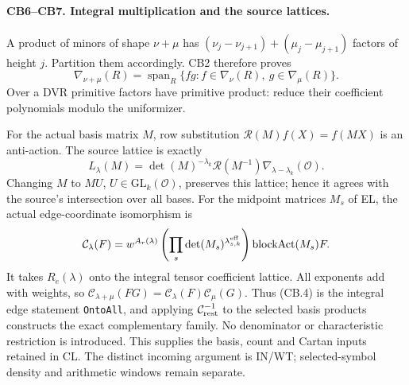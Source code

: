 \paragraph{CB6--CB7. Integral multiplication and the source lattices.}
A product of minors of shape $\nu+\mu$ has
$(\nu_j-\nu_{j+1})+(\mu_j-\mu_{j+1})$ factors of height $j$.
Partition them accordingly. CB2 therefore proves
\[
 \nabla_{\nu+\mu}(R)=\operatorname{span}_R
 \{fg:f\in\nabla_\nu(R),\ g\in\nabla_\mu(R)\}. \tag{CB.4}
\]
Over a DVR primitive factors have primitive product: reduce their coefficient polynomials modulo the uniformizer.

For the actual basis matrix $M$, row substitution $\mathcal R(M)f(X)=f(MX)$ is an anti-action. The source lattice is exactly
\[
 L_\lambda(M)=\det(M)^{-\lambda_k}\mathcal R(M^{-1})\nabla_{\lambda-\lambda_k}(\mathcal O).
\]
Changing $M$ to $MU$, $U\in\mathrm{GL}_k(\mathcal O)$, preserves this lattice; hence it agrees with the source's intersection over all bases.
For the midpoint matrices $M_s$ of EL, the actual edge-coordinate isomorphism is
\[
 \mathcal C_\lambda(F)=w^{A_r(\lambda)}
 \left(\prod_s\det(M_s)^{\lambda^{\rm eff}_{s,k}}\right)
 \operatorname{blockAct}(M_s)F.
\]
It takes $R_e(\lambda)$ onto the integral tensor coefficient lattice.
All exponents add with weights, so
$\mathcal C_{\lambda+\mu}(FG)=\mathcal C_\lambda(F)\mathcal C_\mu(G)$.
Thus (CB.4) is the integral edge statement \texttt{OntoAll}, and applying
$\mathcal C_{\rm rest}^{-1}$ to the selected basis products constructs the exact complementary family.
No denominator or characteristic restriction is introduced.
This supplies the basis, count and Cartan inputs retained in CL.
The distinct incoming argument is IN/WT; selected-symbol density and arithmetic windows remain separate.
